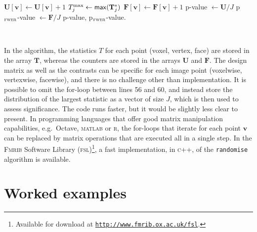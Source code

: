 {\begin{algorithmic}[1]
\State $\mathbf{U}[\mathbf{v}] \leftarrow \mathbf{U}[\mathbf{v}]+1$
\EndIf
\EndFor
\State $T^{\text{max}}_{j} \leftarrow \text{\textsf{max}}(\mathbf{T}_{j}^{*})$
\State $\mathbf{F}[\mathbf{v}] \leftarrow \mathbf{F}[\mathbf{v}]+1$
\EndIf
\EndFor
\EndFor
\State p-value $\leftarrow \mathbf{U} / J$
\State p$_{\text{\textsc{fwer}}}$-value $\leftarrow \mathbf{F} / J$
\State \Return p-value, p$_{\text{\textsc{fwer}}}$-value.
\EndFor
\end{algorithmic}}
\noindent
\HRule\\
\setstretch{\lspac}
\vspace{0mm}

In the algorithm, the statistics $T$ for each point (voxel, vertex, face) are stored in the array $\mathbf{T}$, whereas the counters are stored in the arrays $\mathbf{U}$ and $\mathbf{F}$. The design matrix as well as the contrasts can be specific for each image point (voxelwise, vertexwise, facewise), and there is no challenge other than implementation. It is possible to omit the for-loop between lines 56 and 60, and instead store the distribution of the largest statistic as a vector of size $J$, which is then used to assess significance. The code runs faster, but it would be slightly less clear to present. In programming languages that offer good matrix manipulation capabilities, e.g.\ Octave, \textsc{matlab} or \textsc{r}, the for-loops that iterate for each point $\mathbf{v}$ can be replaced by matrix operations that are executed all in a single step. In the \textsc{Fmrib} Software Library (\textsc{fsl})\footnote{Available for download at \href{http://www.fmrib.ox.ac.uk/fsl}{\texttt{http://www.fmrib.ox.ac.uk/fsl}}.}, a fast implementation, in \textsc{c}++, of the \texttt{randomise} algorithm is available.

\section{Worked examples}
\label{sec:examples}

